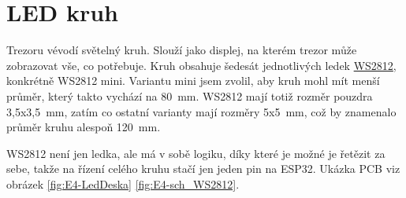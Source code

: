 \section{LED kruh}

Trezoru vévodí světelný kruh. Slouží jako displej, na kterém trezor může zobrazovat vše, co potřebuje. Kruh obsahuje šedesát jednotlivých ledek 
\href{https://cdn-shop.adafruit.com/datasheets/WS2812B.pdf}{WS2812}, konkrétně WS2812 mini. Variantu mini jsem zvolil, aby kruh mohl mít menší
průměr, který takto vychází na 80~mm. WS2812 mají totiž rozměr pouzdra 3,5x3,5~mm, zatím co ostatní varianty mají rozměry 5x5~mm, což by znamenalo průměr kruhu alespoň 120~mm.

WS2812 není jen ledka, ale má v sobě logiku, díky které je možné je řetězit za sebe, takže na řízení celého kruhu stačí jen jeden pin na ESP32.\newline
Ukázka PCB viz obrázek \ref{fig:E4-LedDeska} \ref{fig:E4-sch_WS2812}.

\newpage